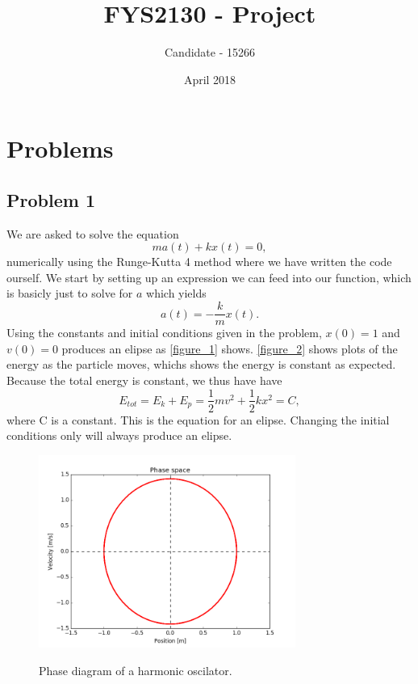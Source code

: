 \documentclass{article}
\title{FYS2130 - Project}
\author{Candidate - 15266}
\date{April 2018}
\begin{document}
\maketitle

\section*{Problems}

\subsection*{Problem 1}
We are asked to solve the equation
\begin{equation}
ma(t) + kx(t) = 0,
\end{equation}
numerically using the Runge-Kutta 4 method where we have written the code ourself. We start by setting up an expression we can feed into our function, which is basicly just to solve for $a$ which yields
\begin{equation}
a(t) = -\frac{k}{m}x(t).
\end{equation}
Using the constants and initial conditions given in the problem, $x(0) = 1$ and $v(0) = 0$ produces an elipse as \ref{figure_1} shows. \ref{figure_2} shows plots of the energy as the particle moves, whichs shows the energy is constant as expected. Because the total energy is constant, we thus have have
\begin{equation}
E_{tot} = E_k + E_p = \frac{1}{2}mv^2 + \frac{1}{2}kx^2 = C,
\end{equation}
where C is a constant. This is the equation for an elipse. Changing the initial conditions only will always produce an elipse.
\begin{figure}[H]
\centering
\includegraphics[width=0.75\textwidth]{problem_1_1}\label{figure_1}
\caption{Phase diagram of a harmonic oscilator.}
\label{fig:problem_b_contour_fig}
\end{figure}
\end{document}
